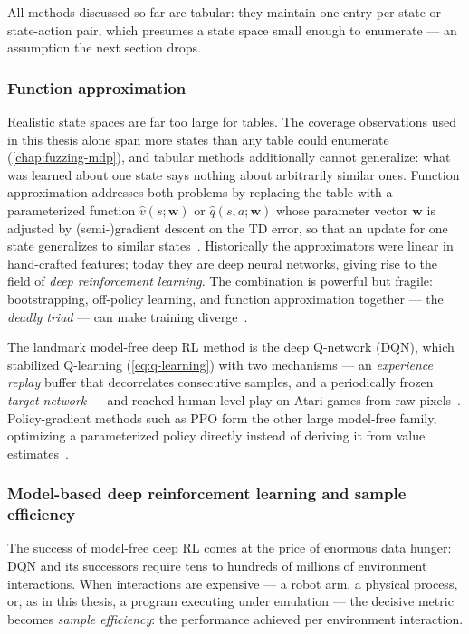 All methods discussed so far are tabular:
they maintain one entry per state or state-action pair, which presumes a state space small enough
to enumerate --- an assumption the next section drops.

\subsubsection{Function approximation}\label{sec:rl-fa}

Realistic state spaces are far too large for tables.
The coverage observations used in this thesis alone span more states than any table could
enumerate (\cref{chap:fuzzing-mdp}), and tabular methods additionally cannot generalize:
what was learned about one state says nothing about arbitrarily similar ones.
Function approximation addresses both problems by replacing the table with a parameterized
function $\hat{v}(s;\mathbf{w})$ or $\hat{q}(s,a;\mathbf{w})$ whose parameter vector $\mathbf{w}$
is adjusted by (semi-)gradient descent on the TD error, so that an update for one state
generalizes to similar states~\cite{sutton_reinforcement_2020}.
Historically the approximators were linear in hand-crafted features; today they are deep neural
networks, giving rise to the field of \emph{deep reinforcement learning}.
The combination is powerful but fragile:
bootstrapping, off-policy learning, and function approximation together --- the \emph{deadly
triad} --- can make training diverge~\cite{sutton_reinforcement_2020}.

The landmark model-free deep RL method is the deep Q-network (DQN), which stabilized Q-learning
(\cref{eq:q-learning}) with two mechanisms --- an \emph{experience replay} buffer that
decorrelates consecutive samples, and a periodically frozen \emph{target network} --- and reached
human-level play on Atari games from raw pixels~\cite{mnih_human-level_2015}.
Policy-gradient methods such as PPO form the other large model-free family, optimizing a
parameterized policy directly instead of deriving it from value
estimates~\cite{schulman_proximal_2017}.

\subsubsection{Model-based deep reinforcement learning and sample efficiency}\label{sec:rl-sample-efficiency}

The success of model-free deep RL comes at the price of enormous data hunger:
DQN and its successors require tens to hundreds of millions of environment interactions.
When interactions are expensive --- a robot arm, a physical process, or, as in this thesis, a
program executing under emulation --- the decisive metric becomes \emph{sample efficiency}:
the performance achieved per environment interaction.

